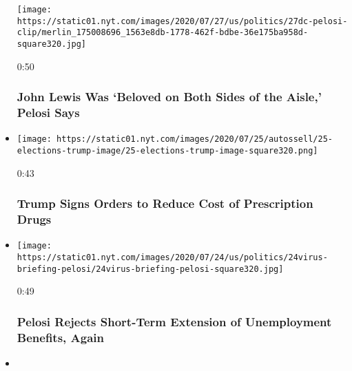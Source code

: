 \begin{itemize}
  \texttt{[image: https://static01.nyt.com/images/2020/07/27/us/politics/27dc-pelosi-clip/merlin\_175008696\_1563e8db-1778-462f-bdbe-36e175ba958d-square320.jpg]}

  0:50

  \hypertarget{john-lewis-was-beloved-on-both-sides-of-the-aisle-pelosi-says}{%
  \subsubsection{John Lewis Was `Beloved on Both Sides of the Aisle,'
  Pelosi
  Says}\label{john-lewis-was-beloved-on-both-sides-of-the-aisle-pelosi-says}}
\item
  \href{https://www.nytimes.com/video/us/100000007255909/trump-executive-order-prescription-drugs.html?action=click\&module=video-series-bar\&region=header\&pgtype=Article\&playlistId=video/us-politics}{}

  \texttt{[image: https://static01.nyt.com/images/2020/07/25/autossell/25-elections-trump-image/25-elections-trump-image-square320.png]}

  0:43

  \hypertarget{trump-signs-orders-to-reduce-cost-of-prescription-drugs}{%
  \subsubsection{Trump Signs Orders to Reduce Cost of Prescription
  Drugs}\label{trump-signs-orders-to-reduce-cost-of-prescription-drugs}}
\item
  \href{https://www.nytimes.com/video/us/100000007256158/pelosi-rejects-unemployment-extension.html?action=click\&module=video-series-bar\&region=header\&pgtype=Article\&playlistId=video/us-politics}{}

  \texttt{[image: https://static01.nyt.com/images/2020/07/24/us/politics/24virus-briefing-pelosi/24virus-briefing-pelosi-square320.jpg]}

  0:49

  \hypertarget{pelosi-rejects-short-term-extension-of-unemployment-benefits-again}{%
  \subsubsection{Pelosi Rejects Short-Term Extension of Unemployment
  Benefits,
  Again}\label{pelosi-rejects-short-term-extension-of-unemployment-benefits-again}}
\item
  \href{https://www.nytimes.com/video/us/100000007243995/portland-protests-federal-government.html?action=click\&module=video-series-bar\&region=header\&pgtype=Article\&playlistId=video/us-politics}{}


\end{itemize}
